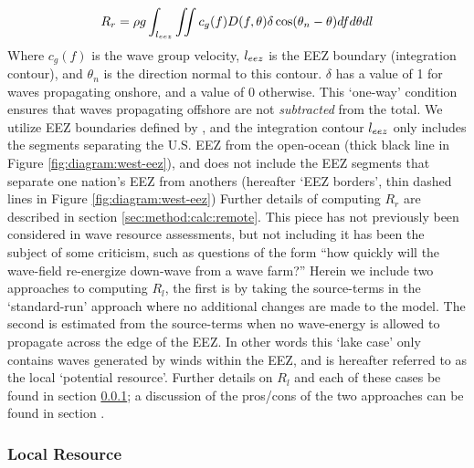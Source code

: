 \begin{align}
  R_r = \rho g \int_{l_{eez}}\iint c_g(f) D(f,\theta) \delta \cos(\theta_n - \theta) df d\theta dl
\end{align}
Where $c_g(f)$ is the wave group velocity, $l_{eez}$ is the EEZ boundary (integration contour), and $\theta_n$ is the direction normal to this contour. $\delta$ has a value of 1 for waves propagating onshore, and a value of 0 otherwise. This `one-way' condition ensures that waves propagating offshore are not {\em subtracted} from the total. 
We utilize EEZ boundaries defined by \citep[]{flandersmarineinstituteMaritimeBoundariesGeodatabase2018}, and the integration contour $l_{eez}$ only includes the segments separating the U.S. EEZ from the open-ocean (thick black line in Figure \ref{fig:diagram:west-eez}), and does not include the EEZ segments that separate one nation's EEZ from anothers (hereafter `EEZ borders', thin dashed lines in Figure \ref{fig:diagram:west-eez})
Further details of computing $R_r$ are described in section \ref{sec:method:calc:remote}.
This piece has not previously been considered in wave resource assessments, but not including it has been the subject of some criticism, such as questions of the form ``how quickly will the wave-field re-energize down-wave from a wave farm?''
Herein we include two approaches to computing $R_l$, the first is by taking the source-terms in the `standard-run' approach where no additional changes are made to the model. The second is estimated from the source-terms when no wave-energy is allowed to propagate across the edge of the EEZ. In other words this `lake case' only contains waves generated by winds within the EEZ, and is hereafter referred to as the local `potential resource'. Further details on $R_l$ and each of these cases be found in section \ref{sec:method:calc:local}; a discussion of the pros/cons of the two approaches can be found in section .

\subsubsection{Local Resource} \label{sec:method:calc:local}

